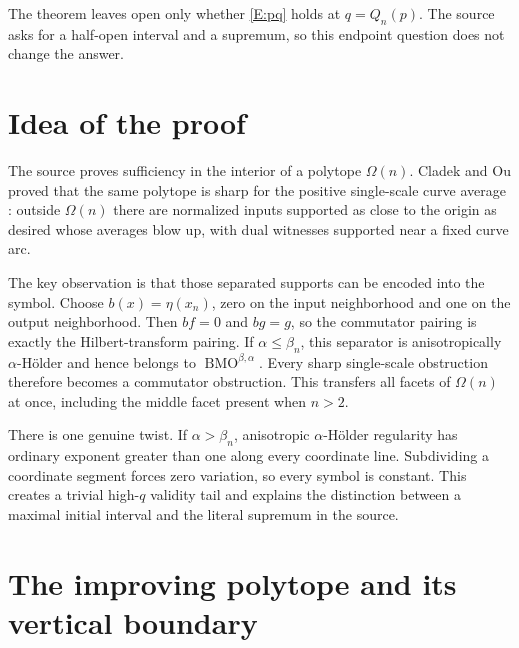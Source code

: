 \documentclass[11pt]{article}
\newcommand{\BMO}{\operatorname{BMO}}
\begin{document}
The theorem leaves open only whether \eqref{E:pq} holds at
$q=Q_n(p)$.  The source asks for a half-open interval and a supremum, so this
endpoint question does not change the answer.

\section{Idea of the proof}

The source proves sufficiency in the interior of a polytope $\Omega(n)$.
Cladek and Ou proved that the same polytope is sharp for the positive
single-scale curve average \cite[Sec.~4.2]{CladekOu}: outside $\Omega(n)$
there are normalized inputs supported as close to the origin as desired whose
averages blow up, with dual witnesses supported near a fixed curve arc.

The key observation is that those separated supports can be encoded into the
symbol.  Choose $b(x)=\eta(x_n)$, zero on the input neighborhood and one on
the output neighborhood.  Then $bf=0$ and $bg=g$, so the commutator pairing
is exactly the Hilbert-transform pairing.  If $\alpha\le\beta_n$, this
separator is anisotropically $\alpha$-Hölder and hence belongs to
$\BMO^{\beta,\alpha}$.  Every sharp single-scale obstruction therefore
becomes a commutator obstruction.  This transfers all facets of
$\Omega(n)$ at once, including the middle facet present when $n>2$.

There is one genuine twist.  If $\alpha>\beta_n$, anisotropic
$\alpha$-Hölder regularity has ordinary exponent greater than one along every
coordinate line.  Subdividing a coordinate segment forces zero variation,
so every symbol is constant.  This creates a trivial high-$q$ validity tail
and explains the distinction between a maximal initial interval and the
literal supremum in the source.

\section{The improving polytope and its vertical boundary}
\end{document}
